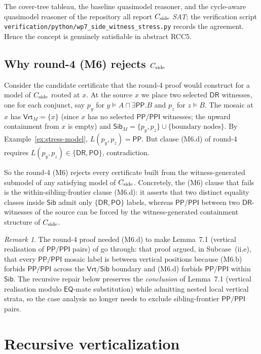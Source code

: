 \documentclass[11pt]{article}
\theoremstyle{definition}
\theoremstyle{remark}
\newtheorem{remark}[theorem]{Remark}
\newcommand{\DR}{\mathsf{DR}}
\newcommand{\PO}{\mathsf{PO}}
\newcommand{\PP}{\mathsf{PP}}
\newcommand{\PPI}{\mathsf{PPI}}
\newcommand{\EQ}{\mathsf{EQ}}
\newcommand{\Vrt}{\mathsf{Vrt}}
\newcommand{\Sib}{\mathsf{Sib}}
\begin{document}
The cover-tree tableau, the baseline quasimodel reasoner, and the
cycle-aware quasimodel reasoner of the repository all report
$C_{\rm side}$ \emph{SAT}; the verification script
\texttt{verification/python/wp7\_side\_witness\_stress.py} records the
agreement.  Hence the concept is genuinely satisfiable in abstract
RCC5.

\subsection{Why round-4 (M6) rejects $C_{\rm side}$}

Consider the candidate certificate that the round-4 proof would
construct for a model of $C_{\rm side}$ rooted at $x$.  At the source
$x$ we place two selected $\DR$ witnesses, one for each conjunct, say
$p_y$ for $y\models A\sqcap\exists\PP.B$ and $p_z$ for $z\models B$.
The mosaic at $x$ has $\Vrt_M=\{x\}$ (since $x$ has no selected
$\PP/\PPI$ witnesses; the upward containment from $x$ is empty) and
$\Sib_M=\{p_y,p_z\}\cup\{\text{boundary nodes}\}$.  By
Example~\ref{ex:stress-model}, $L(p_y,p_z)=\PP$.  But clause (M6.d)
of round-4 requires $L(p_y,p_z)\in\{\DR,\PO\}$, contradiction.

So the round-4 (M6) rejects every certificate built from the
witness-generated submodel of any satisfying model of $C_{\rm side}$.
Concretely, the (M6) clause that fails is the within-sibling-frontier
clause (M6.d): it asserts that two distinct equality classes inside
$\Sib$ admit only $\{\DR,\PO\}$ labels, whereas $\PP/\PPI$ between
two $\DR$-witnesses of the source can be forced by the
witness-generated containment structure of $C_{\rm side}$.

\begin{remark}\label{rem:why-round4-overshoots}
The round-4 proof needed (M6.d) to make Lemma~7.1 (vertical
realisation of $\PP/\PPI$ pairs) of \cite{GPT55Repaired} go through:
that proof argued, in Subcase~(ii.e), that every $\PP/\PPI$ mosaic
label is between vertical positions because (M6.b) forbids
$\PP/\PPI$ across the $\Vrt$/$\Sib$ boundary and (M6.d) forbids
$\PP/\PPI$ within $\Sib$.  The recursive repair below preserves the
\emph{conclusion} of Lemma~7.1 (vertical realisation modulo
$\EQ$-mate substitution) while admitting nested local vertical
strata, so the case analysis no longer needs to exclude
sibling-frontier $\PP/\PPI$ pairs.
\end{remark}

\section{Recursive verticalization}
\label{sec:m6prime}
\end{document}
